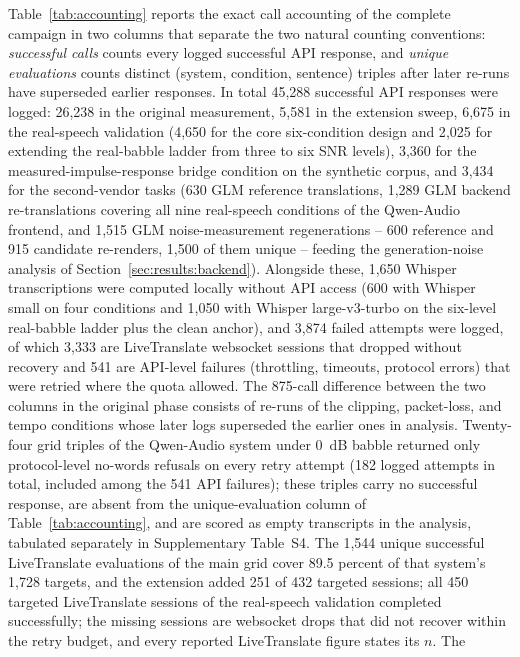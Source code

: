 Table~\ref{tab:accounting} reports the exact call accounting of the complete
campaign in two columns that separate the two natural counting
conventions: \emph{successful calls} counts every logged successful
API response, and \emph{unique evaluations} counts distinct
(system, condition, sentence) triples after later re-runs have superseded
earlier responses. In total 45{,}288 successful API responses were
logged: 26{,}238 in the original measurement, 5{,}581 in the extension
sweep, 6{,}675 in the real-speech validation (4{,}650 for the core
six-condition design and 2{,}025 for extending the real-babble ladder from
three to six SNR levels), 3{,}360 for the measured-impulse-response bridge
condition on the synthetic corpus, and 3{,}434 for the second-vendor tasks
(630 GLM reference translations, 1{,}289 GLM backend re-translations
covering all nine real-speech conditions of the Qwen-Audio frontend, and
1{,}515 GLM noise-measurement regenerations -- 600 reference and 915
candidate re-renders, 1{,}500 of them unique -- feeding the generation-noise
analysis of Section~\ref{sec:results:backend}).
Alongside these, 1{,}650 Whisper transcriptions were computed locally
without API access (600 with Whisper small on four conditions and 1{,}050
with Whisper large-v3-turbo on the six-level real-babble ladder plus the
clean anchor), and 3{,}874 failed attempts were logged, of which 3{,}333 are
LiveTranslate websocket sessions that dropped without recovery and 541 are
API-level failures (throttling, timeouts, protocol errors) that were
retried where the quota allowed. The 875-call difference
between the two columns in the original phase consists of re-runs of the
clipping, packet-loss, and tempo conditions whose later logs superseded the
earlier ones in analysis. Twenty-four grid triples of the Qwen-Audio system
under 0~dB babble returned only protocol-level no-words refusals on every
retry attempt (182 logged attempts in total, included among the 541 API
failures); these triples carry no successful response, are absent from the
unique-evaluation column of Table~\ref{tab:accounting}, and are scored as
empty transcripts in the analysis, tabulated separately in Supplementary
Table~S4. The 1{,}544 unique successful
LiveTranslate evaluations of the main grid cover 89.5 percent of that
system's 1{,}728 targets, and the extension added 251 of 432 targeted
sessions; all 450 targeted LiveTranslate sessions
of the real-speech validation completed successfully; the missing sessions
are websocket drops that did not recover within the
retry budget, and every reported LiveTranslate figure states its $n$. The

